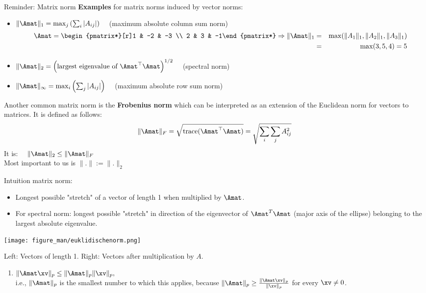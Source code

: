 \documentclass[11pt,compress,t,notes=noshow, xcolor=table]{beamer}
\begin{document}
\begin{vbframe}{Reminder: Matrix norm}
\textbf{Examples} for matrix norms induced by vector norms:
\begin{itemize}
\item $\|\Amat\|_1 = \max_j\left(\sum_i |A_{ij}| \right) \quad$ (maximum absolute column sum norm)
  \begin{eqnarray*}
  \Amat = \begin{pmatrix*}[r]1 & -2 & -3 \\
  2 & 3 & -1\end{pmatrix*}\Rightarrow
  \|\Amat\|_1 &=& \max (\|A_1\|_1, \|A_2\|_1, \|A_3\|_1) \\
  &=& \max (3, 5, 4) = 5
  \end{eqnarray*}
\item $\|\Amat\|_2 = \left(\mbox{largest eigenvalue of } \Amat^\top\Amat \right)^{1/2} \quad$ (spectral norm)
\item $\|\Amat\|_\infty = \max_i\left(\sum_j |A_{ij}| \right) \quad$ (maximum absolute row sum norm)
\end{itemize}
\bigskip
Another common matrix norm is the \textbf{Frobenius norm} which can be interpreted as an extension of the Euclidean norm for vectors to matrices. It is defined as follows: 
$$
\|\Amat\|_F = \sqrt{\mbox{trace}(\Amat^\top\Amat)} = \sqrt{ \sum_i \sum_j A_{ij}^2}
$$
It is: $\quad \|\Amat\|_2 \leq \|\Amat\|_F$\\
\medskip
Most important to us is $\|.\| := \|.\|_2$

\framebreak

Intuition matrix norm:
\begin{itemize}
\item Longest possible "stretch" of a vector of length 1 when multiplied by $\Amat$.
\item For spectral norm: longest possible "stretch" in direction of the eigenvector of $\Amat^T\Amat$ (major axis of the ellipse) belonging to the largest absolute eigenvalue.
\end{itemize}

\begin{center}
\texttt{[image: figure\_man/euklidischenorm.png]}


\begin{footnotesize}
Left: Vectors of length 1. Right: Vectors after multiplication by $A$.
\end{footnotesize}
\end{center}

\framebreak

\begin{enumerate}
\item $ \|\Amat \xv\|_p \leq \|\Amat\|_p\|\xv\|_p,$ \\ 
  i.e., $\|\Amat\|_p$ is the smallest number to which this applies,
  because $\|\Amat\|_p \geq \frac{\|\Amat \xv\|_p}{\|\xv\|_p}$ for every $\xv \not= 0$.
  

\end{enumerate}
\end{vbframe}
\end{document}
